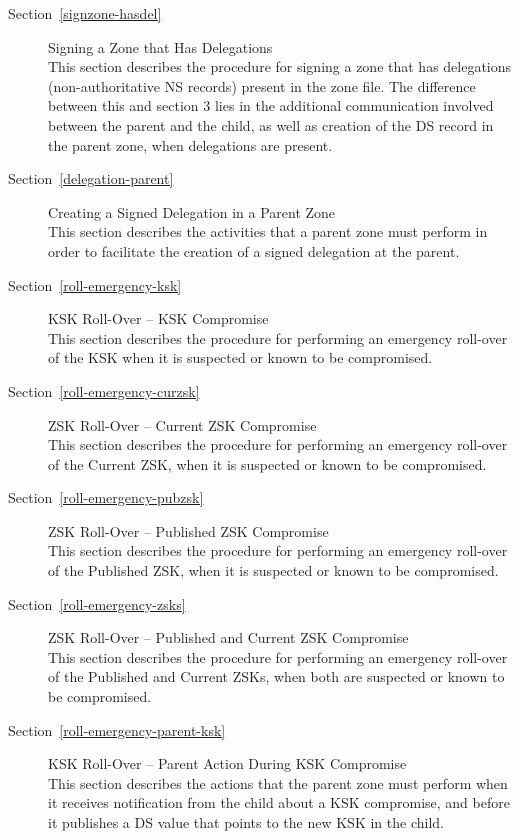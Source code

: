 \begin{description}
\item [Section~\ref{signzone-hasdel}] {Signing a Zone that Has Delegations}\\
This section describes the procedure for signing a zone that has delegations
(non-authoritative NS records) present in the zone file. The difference
between this and section 3 lies in the additional communication involved
between the parent and the child, as well as creation of the DS record in the
parent zone, when delegations are present.

\item [Section~\ref{delegation-parent}] {Creating a Signed Delegation in a Parent Zone}\\
This section describes the activities that a parent zone must perform
in order to facilitate the creation of a signed delegation at the parent.

\item [Section~\ref{roll-emergency-ksk}] {KSK Roll-Over -- KSK Compromise}\\
This section describes the procedure for performing an emergency roll-over
of the KSK when it is suspected or known to be compromised.

\item [Section~\ref{roll-emergency-curzsk}] {ZSK Roll-Over -- Current ZSK Compromise}\\
This section describes the procedure for performing an emergency roll-over
of the Current ZSK, when it is suspected or known to be compromised.

\item [Section~\ref{roll-emergency-pubzsk}] {ZSK Roll-Over -- Published ZSK Compromise}\\
This section describes the procedure for performing an emergency roll-over
of the Published ZSK, when it is suspected or known to be compromised.

\item [Section~\ref{roll-emergency-zsks}] {ZSK Roll-Over -- Published and Current ZSK Compromise}\\
This section describes the procedure for performing an emergency roll-over
of the Published and Current ZSKs, when both are suspected or known to be
compromised.

\item [Section~\ref{roll-emergency-parent-ksk}] {KSK Roll-Over -- Parent Action During KSK Compromise}\\
This section describes the actions that the parent zone must perform when it
receives notification from the child about a KSK compromise, and before it
publishes a DS value that points to the new KSK in the child.

\end{description}

